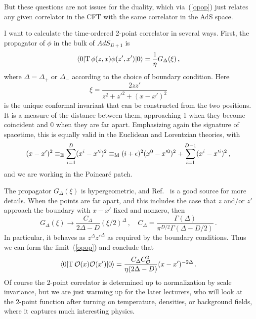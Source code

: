 \documentclass[12pt]{article}
\begin{document}
{But these questions are not issues for the duality, which via~(\ref{opop}) just relates any given correlator in the CFT with the same correlator in the AdS space.

I want to calculate the time-ordered 2-point correlator in several ways.  First, the propagator of $\phi$ in the bulk of $AdS_{D+1}$ is
\begin{equation}
\langle 0 | {\rm T}\, \phi(z,x) \phi(z',x') | 0 \rangle = \frac{1}{\eta} G_\Delta(\xi) \,,
\end{equation}
where $\Delta = \Delta_+$ or $\Delta_-$ according to the choice of boundary condition.
Here 
\begin{equation}
\xi = \frac{2 z z'}{z^2 + z'^2 + (x-x')^2}  
\end{equation}
is the unique conformal invariant that can be constructed from the two positions.  It is a measure of the distance between them, approaching 1 when they become coincident and 0 when they are far apart.  Emphasizing again the signature of spacetime, this is equally valid in the Euclidean and Lorentzian theories, with
\begin{equation}
(x-x')^2 \equiv_{\rm E} \sum_{i = 1}^D (x^i - x'^i)^2 \equiv_{\rm M} (i+\epsilon)^2 (x^0- x'^0)^2 
+ \sum_{i = 1}^{D-1} (x^i - x'^i)^2 \,,
\end{equation}
and we are working in the Poincar\'e patch.

The propagator $G_\Delta(\xi)$ is hypergeometric, and Ref.~\cite{D'Hoker:2002aw} is a good source for more details.  When the points are far apart, and this includes the case that $z$ and/or $z'$ approach the boundary with $x - x'$ fixed and nonzero, then
\begin{equation}
G_\Delta(\xi) \to \frac{C_{\Delta}}{2\Delta-D} (\xi/2)^\Delta  \,,\quad C_{\Delta} = \frac{\Gamma(\Delta)}{\pi^{D/2} \Gamma(\Delta-D/2)} \,.
\end{equation}
In particular, it behaves as $z^\Delta z'^\Delta$ as required by the boundary conditions.  Thus we can form the limit~(\ref{opop}) and conclude that
\begin{equation}
\langle 0 | {\rm T}\, {\cal O}(x) {\cal O}(x') | 0 \rangle =  \frac{C_{\Delta}C^2_{\cal O}}{\eta(2\Delta-D)} (x - x')^{-2\Delta} \,.
\end{equation}
Of course the 2-point correlator is determined up to normalization by scale invariance, but we are just warming up for the later lecturers, who will look at the 2-point function after turning on temperature, densities, or background fields, where it captures much interesting physics.

}
\end{document}
